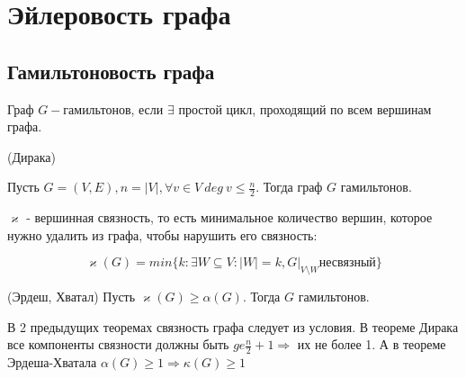 \section{Эйлеровость графа}
\subsection{Гамильтоновость графа}
\begin{definition}
  Граф \(G - \)гамильтонов, если \(\exists\) простой цикл, проходящий по всем вершинам графа.
\end{definition}

\begin{theorem}{(Дирака)}

  Пусть \(G = (V, E), n = |V|, \forall v \in V \ deg \  v \le \frac{n}{2}\). Тогда граф \(G\) гамильтонов.
\end{theorem}

\begin{definition}
  \(\varkappa\) - вершинная связность, то есть минимальное количество вершин, которое нужно удалить из графа, чтобы нарушить его связность:

  \[\varkappa(G) = min \{k : \exists W \subseteq V: |W| = k, G |_{V 
  \setminus W} \text{несвязный}\}\]
\end{definition}
\begin{theorem}{(Эрдеш, Хватал)}
  Пусть \(\varkappa(G) \ge \alpha(G)\). Тогда \(G\) гамильтонов. 
  
\end{theorem}

\begin{note}
В 2 предыдущих теоремах связность графа следует из условия. В теореме Дирака все компоненты связности должны быть \(ge \frac{n}{2} + 1 \Longrightarrow \) их не более 1. А в теореме Эрдеша-Хватала \(\alpha(G) \ge 1 \Longrightarrow \kappa(G) \ge 1\)
\end{note}



